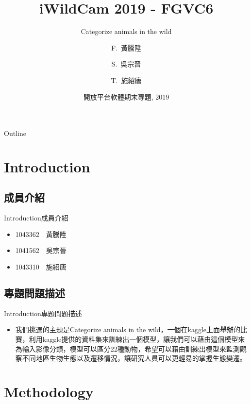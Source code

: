 \documentclass{beamer}
\title{iWildCam 2019 - FGVC6}
\subtitle{Categorize animals in the wild}
\author{F.~黃騰陞\inst{1} \and S.~吳宗晉\inst{2} \and T.~施紹唐\inst{3}}
\institute[Universities of Somewhere and Elsewhere] %
{
  \inst{1}%
  Department of Computer Science\\
  University of Yuan Ze
}
\date{開放平台軟體期末專題, 2019}
\begin{document}
\begin{CJK}{UTF8}{}
\begin{frame}
  \titlepage
\end{frame}

\begin{frame}{Outline}
\setcounter{tocdepth}{1}
  \tableofcontents
\end{frame}

\section{Introduction}

\subsection{成員介紹}

\begin{frame}{Introduction}{成員介紹}
  \begin{itemize}
  \item {
    1043362　黃騰陞
  }
  \item {
    1041562　吳宗晉
  }
  \item {
    1043310　施紹唐	
  }
  \end{itemize}
\end{frame}

\subsection{專題問題描述}

\begin{frame}{Introduction}{專題問題描述}
  \begin{itemize}
  \item {
    我們挑選的主題是Categorize animals in the wild，一個在kaggle上面舉辦的比賽，利用kaggle提供的資料集來訓練出一個模型，讓我們可以藉由這個模型來為輸入影像分類，模型可以區分22種動物，希望可以藉由訓練出模型來監測觀察不同地區生物生態以及遷移情況，讓研究人員可以更輕易的掌握生態變遷。

  }
  
  \end{itemize}
\end{frame}

\section{Methodology}


\end{CJK}
\end{document}
